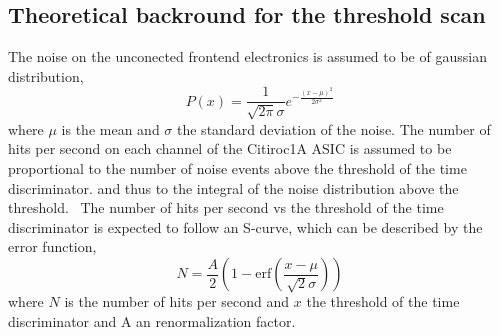 \subsection{Theoretical backround for the threshold scan} \label{sec:noise_theory}
The noise on the unconected frontend electronics is assumed to be of gaussian distribution,
\begin{equation}
    P(x) = \frac{1}{\sqrt{2\pi}\sigma}e^{-\frac{(x-\mu)^2}{2\sigma^2}}
\end{equation}
where $\mu$ is the mean and $\sigma$ the standard deviation of the noise.\autocite{Theorynoise}
\newline
The number of hits per second on each channel of the Citiroc1A ASIC is assumed to be proportional to the number of noise events above the threshold of the time discriminator.
and thus to the integral of the noise distribution above the threshold.\
\newline
The number of hits per second vs the threshold of the time discriminator is expected to follow an S-curve, which can be described by the error function,
\begin{equation}
    N = \frac{A}{2} \left( 1 - \text{erf} \left( \frac{x - \mu}{\sqrt{2}\sigma} \right) \right)
\end{equation}
where $N$ is the number of hits per second and $x$ the threshold of the time discriminator and A an renormalization factor.\autocite{Theorynoise}